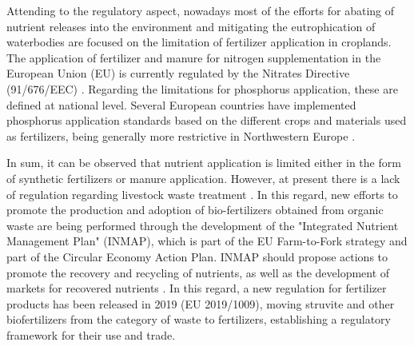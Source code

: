 \begin{refsection}[referencesCh1]
Attending to the regulatory aspect, nowadays most of the efforts for abating of nutrient releases into the environment and mitigating the eutrophication of waterbodies are focused on the limitation of fertilizer application in croplands. The application of fertilizer and manure for nitrogen supplementation in the European Union (EU) is currently regulated by the Nitrates Directive (91/676/EEC) \citep{GRIZZETTI2021102281}. Regarding the limitations for phosphorus application, these are defined at national level. Several European countries have implemented phosphorus application standards based on the different crops and materials used as fertilizers,
being generally more restrictive in Northwestern Europe \citep{amery2014agricultural}. 

In sum, it can be observed that nutrient application is limited either in the form of synthetic fertilizers or manure application. However, at present there is a lack of regulation regarding livestock waste treatment \citep{Piot_Lepetit2012}. In this regard, new efforts to promote the production and adoption of bio-fertilizers obtained from organic waste are being performed through the development of the "Integrated Nutrient Management Plan" (INMAP), which is part of the EU Farm-to-Fork strategy and part of the Circular Economy Action Plan. INMAP should propose actions to promote the recovery and recycling of nutrients, as well as the development of markets for recovered nutrients \citep{ESSP2021, CircularEconomyActionPlan}. In this regard, a new regulation for fertilizer products has been released in 2019 (EU 2019/1009), moving struvite and other biofertilizers from the category of waste to fertilizers, establishing a regulatory framework for their use and trade.


\end{refsection}
